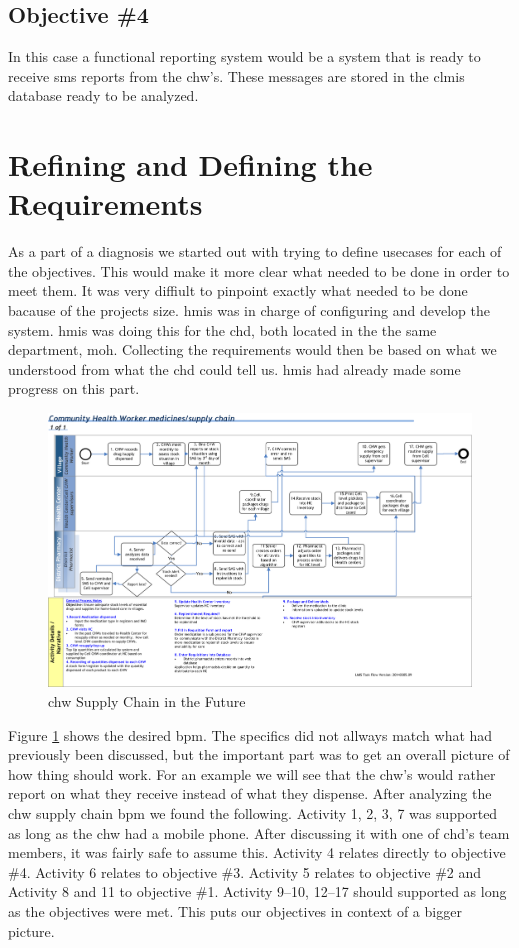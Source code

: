 \subsection{Objective \#4}
In this case a functional reporting system would be a system that is ready to receive \gls{sms} reports from the \gls{chw}'s. These messages are stored in the \gls{clmis} database ready to be analyzed. 

\section{Refining and Defining the Requirements}
As a part of a diagnosis we started out with trying to define usecases for each of the objectives. 
This would make it more clear what needed to be done in order to meet them.
It was very diffiult to pinpoint exactly what needed to be done bacause of the projects size. 
\gls{hmis} was in charge of configuring and develop the system. \gls{hmis} was doing this for the \gls{chd}, both located in the the same department, \gls{moh}. 
Collecting the requirements would then be based on what we understood from what the \gls{chd} could tell us. \gls{hmis} had already made some progress on this part.  

\begin{figure}
\centering
\includegraphics[width=\textwidth]{case/img/chwSupplyChainFuture}
\caption{\gls{chw} Supply Chain in the Future}
\label{fig:chwSupplyChainFuture}
\end{figure}

Figure \ref{fig:chwSupplyChainFuture} shows the desired \gls{bpm}. The specifics did not allways match what had previously been discussed, but the important part was to get an overall picture of how thing should work. For an example we will see that the \gls{chw}'s would rather report on what they receive instead of what they dispense. After analyzing the \gls{chw} supply chain \gls{bpm} we found the following. 
Activity 1, 2, 3, 7 was supported as long as the \gls{chw} had a mobile phone. After discussing it with one of \gls{chd}'s team members, it was fairly safe to assume this. 
Activity 4 relates directly to objective \#4.
Activity 6 relates to objective \#3. 
Activity 5 relates to objective \#2 and Activity 8 and 11 to objective \#1. Activity 9--10, 12--17 should supported as long as the objectives were met. 
This puts our objectives in context of a bigger picture.

